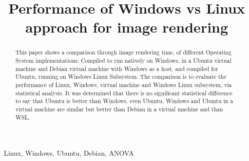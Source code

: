 \documentclass[conference]{IEEEtran}
\begin{document}
\title{Performance of Windows vs Linux approach for image rendering}

\author{

}

\maketitle

\begin{abstract}
This paper shows a comparison through image rendering time, of different Operating System implementations; Compiled to run natively on Windows, in a Ubuntu virtual machine and Debian virtual machine with Windows as a host, and compiled for Ubuntu, running on Windows Linux Subsystem. The comparison is to evaluate the performance of Linux, Windows, virtual machine and Windows Linux subsystem, via statistical analysis.  It was determined that there is no significant statistical difference to say that Ubuntu is better than Windows, even Ubuntu, Windows and Ubuntu in a virtual machine are similar but better than Debian in a virtual machine and than WSL.

\end{abstract}

\begin{IEEEkeywords}
Linux, Windows, Ubuntu, Debian, ANOVA
\end{IEEEkeywords}
\end{document}
